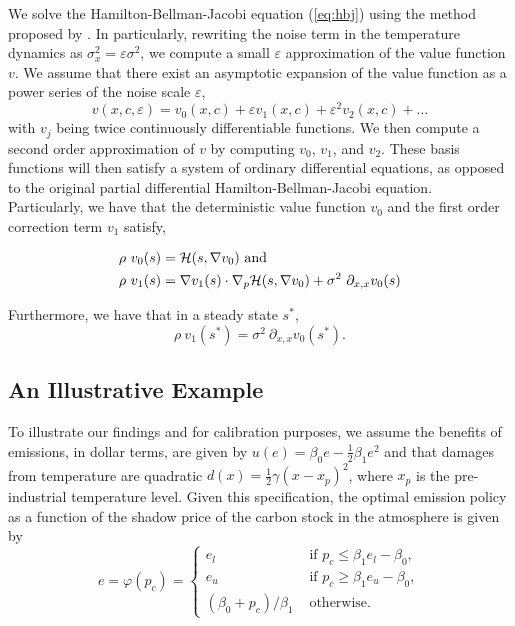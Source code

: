 \documentclass[../../main.tex]{subfiles}
\begin{document}
We solve the Hamilton-Bellman-Jacobi equation (\ref{eq:hbj}) using the method proposed by . In particularly, rewriting the noise term in the temperature dynamics as $\sigma_x^2 = \varepsilon \sigma^2$, we compute a small $\varepsilon$ approximation of the value function $v$. We assume that there exist an asymptotic expansion of the value function as a power series of the noise scale $\varepsilon$, \begin{equation}
    v(x, c, \varepsilon) = v_0(x, c) + \varepsilon v_1(x, c) + \varepsilon^2 v_2(x, c) + \ldots
\end{equation} with $v_j$ being twice continuously differentiable functions. We then compute a second order approximation of $v$ by computing $v_0$, $v_1$, and $v_2$. These basis functions will then satisfy a system of ordinary differential equations, as opposed to the original partial differential Hamilton-Bellman-Jacobi equation. Particularly, we have that the deterministic value function $v_0$ and the first order correction term $v_1$ satisfy,

\begin{align}
    \rho \ v_0(s) &= \mathcal{H}(s, \nabla v_0) \text{ and } \\
    \rho \ v_1(s) &= \nabla v_1(s) \cdot \nabla_p\mathcal{H}(s, \nabla v_0) + \sigma^2 \ \partial_{x, x} v_0(s)
\end{align}

Furthermore, we have that in a steady state $s^*$, \begin{equation}
    \rho \ v_1(s^*) = \sigma^2 \ \partial_{x, x} v_0(s^*).
\end{equation}

\subsection{An Illustrative Example}

To illustrate our findings and for calibration purposes, we assume the benefits of emissions, in dollar terms, are given by $u(e) = \beta_0 e - \frac{1}{2} \beta_1 e^2$ and that damages from temperature are quadratic $d(x) = \frac{1}{2}\gamma (x - x_p)^2$, where $x_p$ is the pre-industrial temperature level. Given this specification, the optimal emission policy as a function of the shadow price of the carbon stock in the atmosphere is given by \begin{equation}
    e = \varphi(p_c) = \begin{cases}
        e_l &\text{ if } p_c \leq \beta_1 e_l - \beta_0, \\
        e_u &\text{ if } p_c \geq \beta_1 e_u - \beta_0,\\
        (\beta_0 + p_c) / \beta_1  &\text{ otherwise.}
    \end{cases}
\end{equation}
\end{document}
